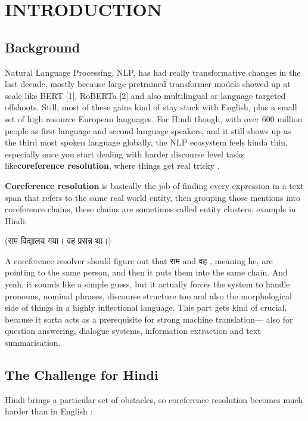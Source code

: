 \documentclass[12pt,a4paper]{report}
\begin{document}
\chapter{INTRODUCTION}

\section{Background}

Natural Language Processing, NLP, has had really transformative changes in the last decade, mostly because large pretrained transformer models showed up at scale like BERT \cite{devlin2018bert} [1], RoBERTa \cite{liu2019roberta} [2] and also multilingual or language targeted offshoots. Still, most of these gains kind of stay stuck with English, plus a small set of high resource European languages. For Hindi though, with over 600 million people as first language and second language speakers, and it still shows up as the third most spoken language globally, the NLP ecosystem feels kinda thin, especially once you start dealing with harder discourse level tasks like\textbf{coreference resolution}, where things get real tricky .

\textbf{Coreference resolution} is basically the job of finding every expression in a text span that refers to the same real world entity, then grouping those mentions into coreference chains, these chains are sometimes called entity clusters. example in Hindi:

\begin{center}
({\hindifont राम विद्यालय गया। वह प्रसन्न था।})
\end{center}

A coreference resolver should figure out that {\hindifont राम}  and {\hindifont वह} , meaning he, are pointing to the same person, and then it puts them into the same chain. And yeah, it sounds like a simple guess, but it actually forces the system to handle pronouns, nominal phrases, discourse structure too and also the morphological side of things in a highly inflectional language. This part gets kind of crucial, because it sorta acts as a prerequisite for strong machine translation— also for question answering, dialogue systems, information extraction and text summarisation.

\section{The Challenge for Hindi}

Hindi brings a particular set of obstacles, so coreference resolution becomes much harder than in English :
\end{document}
